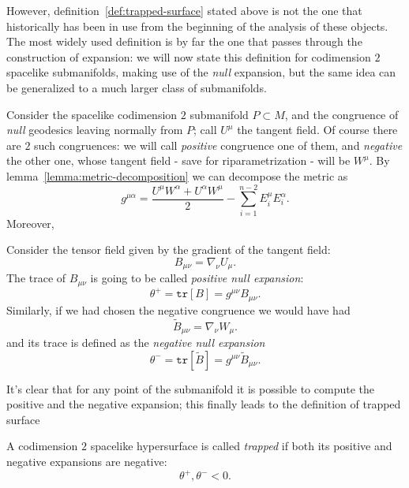 However, definition~\ref{def:trapped-surface} stated above is not the one that historically has been in use from the beginning of the analysis of these objects. The most widely used definition is by far the one that passes through the construction of expansion: we will now state this definition for codimension \(2\) spacelike submanifolds, making use of the \emph{null} expansion, but the same idea can be generalized to a much larger class of submanifolds. 

Consider the spacelike codimension \(2\) submanifold \(P\subset M\), and the congruence of \emph{null} geodesics leaving normally from \(P\); call \(U^{\mu}\) the tangent field. 
Of course there are \(2\) such congruences: we will call \emph{positive} congruence one of them, and \emph{negative} the other one, whose tangent field - save for riparametrization - will be \(W^{\mu}\). By lemma~\ref{lemma:metric-decomposition} we can decompose the metric as 
\[
g^{\mu\alpha} = \frac{U^{\mu}W^{\alpha} + U^{\alpha}W^{\mu}}{2} - \sum_{i=1}^{n - 2}E_i^{\mu}E_i^{\alpha}.
\]
Moreover,
\begin{definition}
	 Consider the tensor field given by the gradient of the tangent field:
	\[
	B_{\mu\nu} = \nabla_{\nu}U_{\mu}.
	\]
	The trace of \(B_{\mu\nu}\) is going to be called \emph{positive null expansion}:
	\[
	\theta^{+} = \texttt{tr}\left[B\right] = g^{\mu\nu}B_{\mu\nu}.
	\]
	Similarly, if we had chosen the negative congruence we would have had
	\[
	\tilde{B}_{\mu\nu} = \nabla_{\nu}W_{\mu}.
	\]
	and its trace is defined as the \emph{negative null expansion}
	\[
	\theta^{-} = \texttt{tr}\left[\tilde{B}\right] = g^{\mu\nu}\tilde{B}_{\mu\nu}.
	\]
\end{definition}

It's clear that for any point of the submanifold it is possible to compute the positive and the negative expansion; this finally leads to the definition of trapped surface
\begin{definition}
	A codimension \(2\) spacelike hypersurface is called \emph{trapped} if both its positive and negative expansions are negative:
	\[
	\theta^+ , \theta^- < 0.
	\]
\end{definition}

